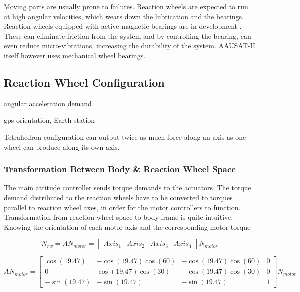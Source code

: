Moving parts are usually prone to failures. Reaction wheels are expected to run at high angular velocities, which wears down the lubrication and the bearings. Reaction wheels equipped with active magnetic bearings are in development \cite{MagneticReactWheel}. These can eliminate friction from the system and by controlling the bearing, can even reduce micro-vibrations, increasing the durability of the system. AAUSAT-II itself however uses mechanical wheel bearings.

\subsection{Reaction Wheel Configuration}

angular acceleration demand \cite{ReactionWheelConfigSim} \cite{ReactConfigThesis}

gps orientation, Earth station

Tetrahedron configuration can output twice as much force along an axis as one wheel can produce along its own axis.

\subsubsection{Transformation Between Body \& Reaction Wheel Space}

The main attitude controller sends torque demands to the actuators. The torque demand distributed to the reaction wheels have to be converted to torques parallel to reaction wheel axes, in order for the motor controllers to function. Transformation from reaction wheel space to body frame is quite intuitive. Knowing the orientation of each motor axis and the corresponding motor torque

\begin{equation}
N_{rw} = A N_{motor} = \begin{bmatrix}
Axis_{1}       & Axis_{2}  & Axis_{3}  & Axis_{4} 
\end{bmatrix} N_{motor}
\end{equation}

\begin{equation}
A N_{motor}  = 
\begin{bmatrix}
\cos(19.47)       & -\cos(19.47) \cos(60)  &  -\cos(19.47) \cos(60)  & 0 \\
0       & \cos(19.47) \cos(30)  &  -\cos(19.47) \cos(30)  & 0 \\
-\sin(19.47)       & -\sin(19.47)   &  -\sin(19.47)   & 1
\end{bmatrix} N_{motor}
\end{equation}

